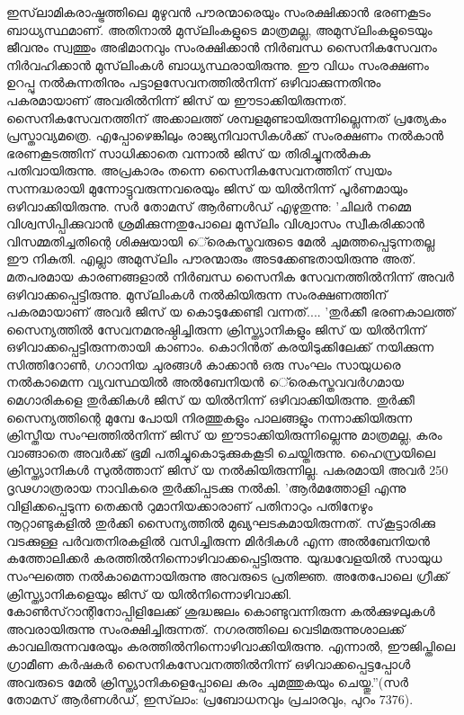 ഇസ്‌ലാമികരാഷ്ട്രത്തിലെ മുഴുവന്‍ പൗരന്മാരെയും സംരക്ഷിക്കാന്‍ ഭരണകൂടം ബാധ്യസ്ഥമാണ്. അതിനാല്‍ മുസ്‌ലിംകളുടെ മാത്രമല്ല, അമുസ്‌ലിംകളുടെയും ജീവനും സ്വത്തും അഭിമാനവും സംരക്ഷിക്കാന്‍ നിര്‍ബന്ധ സൈനികസേവനം നിര്‍വഹിക്കാന്‍ മുസ്‌ലിംകള്‍ ബാധ്യസ്ഥരായിരുന്നു. ഈ വിധം സംരക്ഷണം ഉറപ്പു നല്‍കുന്നതിനും പട്ടാളസേവനത്തില്‍നിന്ന് ഒഴിവാക്കുന്നതിനും പകരമായാണ് അവരില്‍നിന്ന് ജിസ് യ ഈടാക്കിയിരുന്നത്. സൈനികസേവനത്തിന് അക്കാലത്ത് ശമ്പളമുണ്ടായിരുന്നില്ലെന്നത് പ്രത്യേകം പ്രസ്താവ്യമത്രെ. എപ്പോഴെങ്കിലും രാജ്യനിവാസികള്‍ക്ക് സംരക്ഷണം നല്‍കാന്‍ ഭരണകൂടത്തിന് സാധിക്കാതെ വന്നാല്‍ ജിസ് യ തിരിച്ചുനല്‍കുക പതിവായിരുന്നു. അപ്രകാരം തന്നെ സൈനികസേവനത്തിന് സ്വയം സന്നദ്ധരായി മുന്നോട്ടുവരുന്നവരെയും ജിസ് യ യില്‍നിന്ന് പൂര്‍ണമായും ഒഴിവാക്കിയിരുന്നു. സര്‍ തോമസ് ആര്‍ണള്‍ഡ് എഴുതുന്നു: 'ചിലര്‍ നമ്മെ വിശ്വസിപ്പിക്കുവാന്‍ ശ്രമിക്കുന്നതുപോലെ മുസ്‌ലിം വിശ്വാസം സ്വീകരിക്കാന്‍ വിസമ്മതിച്ചതിന്റെ ശിക്ഷയായി െ്രെകസ്തവരുടെ മേല്‍ ചുമത്തപ്പെടുന്നതല്ല ഈ നികുതി. എല്ലാ അമുസ്‌ലിം പൗരന്മാരും അടക്കേണ്ടതായിരുന്നു അത്. മതപരമായ കാരണങ്ങളാല്‍ നിര്‍ബന്ധ സൈനിക സേവനത്തില്‍നിന്ന് അവര്‍ ഒഴിവാക്കപ്പെട്ടിരുന്നു. മുസ്‌ലിംകള്‍ നല്‍കിയിരുന്ന സംരക്ഷണത്തിന് പകരമായാണ് അവര്‍ ജിസ് യ കൊടുക്കേണ്ടി വന്നത്....
'തുര്‍ക്കീ ഭരണകാലത്ത് സൈന്യത്തില്‍ സേവനമനുഷ്ഠിച്ചിരുന്ന ക്രിസ്ത്യാനികളും ജിസ് യ യില്‍നിന്ന് ഒഴിവാക്കപ്പെട്ടിരുന്നതായി കാണാം. കൊറിന്‍ത് കരയിടുക്കിലേക്ക് നയിക്കുന്ന സിത്തിറോണ്‍, ഗറാനിയ ചുരങ്ങള്‍ കാക്കാന്‍ ഒരു സംഘം സായുധരെ നല്‍കാമെന്ന വ്യവസ്ഥയില്‍ അല്‍ബേനിയന്‍ െ്രെകസ്തവവര്‍ഗമായ മെഗാരികളെ തുര്‍ക്കികള്‍ ജിസ് യ യില്‍നിന്ന് ഒഴിവാക്കിയിരുന്നു. തുര്‍ക്കീ സൈന്യത്തിന്റെ മുമ്പേ പോയി നിരത്തുകളും പാലങ്ങളും നന്നാക്കിയിരുന്ന ക്രിസ്തീയ സംഘത്തില്‍നിന്ന് ജിസ് യ ഈടാക്കിയിരുന്നില്ലെന്നു മാത്രമല്ല, കരം വാങ്ങാതെ അവര്‍ക്ക് ഭൂമി പതിച്ചുകൊടുക്കുകകൂടി ചെയ്തിരുന്നു. ഹൈസ്രയിലെ ക്രിസ്ത്യാനികള്‍ സുല്‍ത്താന് ജിസ് യ നല്‍കിയിരുന്നില്ല. പകരമായി അവര്‍ 250 ദൃഢഗാത്രരായ നാവികരെ തുര്‍ക്കിപ്പടക്കു നല്‍കി.
'ആര്‍മത്തോളി എന്നു വിളിക്കപ്പെടുന്ന തെക്കന്‍ റുമാനിയക്കാരാണ് പതിനാറും പതിനേഴും നൂറ്റാണ്ടുകളില്‍ തുര്‍ക്കി സൈന്യത്തില്‍ മുഖ്യഘടകമായിരുന്നത്. സ്‌കൂട്ടാരിക്കു വടക്കുള്ള പര്‍വതനിരകളില്‍ വസിച്ചിരുന്ന മിര്‍ദികള്‍ എന്ന അല്‍ബേനിയന്‍ കത്തോലിക്കര്‍ കരത്തില്‍നിന്നൊഴിവാക്കപ്പെട്ടിരുന്നു. യുദ്ധവേളയില്‍ സായുധ സംഘത്തെ നല്‍കാമെന്നായിരുന്നു അവരുടെ പ്രതിജ്ഞ. അതേപോലെ ഗ്രീക്ക് ക്രിസ്ത്യാനികളെയും ജിസ് യ യില്‍നിന്നൊഴിവാക്കി. കോണ്‍സ്‌റാന്റിനോപ്പിളിലേക്ക് ശുദ്ധജലം കൊണ്ടുവന്നിരുന്ന കല്‍ക്കുഴലുകള്‍ അവരായിരുന്നു സംരക്ഷിച്ചിരുന്നത്. നഗരത്തിലെ വെടിമരുന്നുശാലക്ക് കാവലിരുന്നവരേയും കരത്തില്‍നിന്നൊഴിവാക്കിയിരുന്നു. എന്നാല്‍, ഈജിപ്തിലെ ഗ്രാമീണ കര്‍ഷകര്‍ സൈനികസേവനത്തില്‍നിന്ന് ഒഴിവാക്കപ്പെട്ടപ്പോള്‍ അവരുടെ മേല്‍ ക്രിസ്ത്യാനികളെപ്പോലെ കരം ചുമത്തുകയും ചെയ്തു.''(സര്‍ തോമസ് ആര്‍ണള്‍ഡ്, ഇസ്‌ലാം: പ്രബോധനവും പ്രചാരവും, പുറം 7376).
